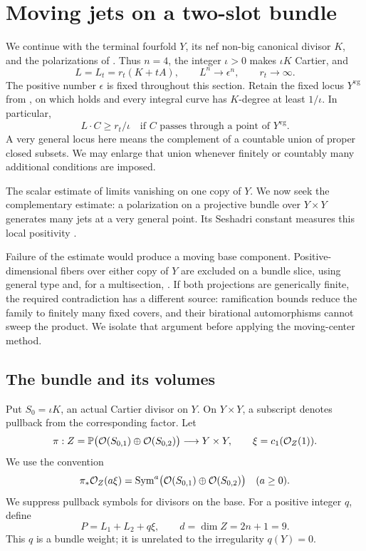 \section{Moving jets on a two-slot bundle}
\label{sec:two-slot-jets}

We continue with the terminal fourfold \(Y\), its nef non-big canonical
divisor \(K\), and the polarizations of
. Thus \(n=4\), the integer
\(\iota>0\) makes \(\iota K\) Cartier, and
\[
 L=L_t=r_t(K+tA),\qquad L^n\longrightarrow\epsilon^n,\qquad
 r_t\longrightarrow\infty .
\]
The positive number \(\epsilon\) is fixed throughout this section.
Retain the fixed locus \(Y^{\mathrm{vg}}\) from
, on which  holds
and every integral curve has \(K\)-degree at least \(1/\iota\).
In particular,
\begin{equation}\label{eq:two-slot-curve-lower-bound}
 L\cdot C\ge r_t/\iota
 \quad\text{if \(C\) passes through a point of \(Y^{\mathrm{vg}}\).}
\end{equation}
A very general locus here means the complement of a countable union
of proper closed subsets. We may enlarge that union whenever finitely
or countably many additional conditions are imposed.

The scalar estimate of  limits vanishing
on one copy of \(Y\). We now seek the complementary estimate: a
polarization on a projective bundle over \(Y\times Y\) generates
many jets at a very general point. Its Seshadri constant measures
this local positivity \cite[Chapter~5]{Lazarsfeld2004I}.

Failure of the estimate would produce a moving base component.
Positive-dimensional fibers over either copy of \(Y\) are excluded
on a bundle slice, using general type and, for a multisection,
. If both projections are generically
finite, the required contradiction has a different source:
ramification bounds reduce the family to finitely many fixed
covers, and their birational automorphisms cannot sweep the product.
We isolate that argument before applying the moving-center method.

\subsection{The bundle and its volumes}

Put \(S_0=\iota K\), an actual Cartier divisor on \(Y\). On
\(Y\times Y\), a subscript denotes pullback from the corresponding
factor. Let
\begin{equation}\label{eq:two-slot-bundle}
 \pi:Z=\mathbb P\bigl(\mathcal O(S_{0,1})\oplus\mathcal O(S_{0,2})\bigr)
       \longrightarrow Y\times Y,\qquad
 \xi=c_1(\mathcal O_Z(1)).
\end{equation}
We use the convention
\[
 \pi_*\mathcal O_Z(a\xi)
 =\operatorname{Sym}^a\bigl(\mathcal O(S_{0,1})\oplus\mathcal O(S_{0,2})\bigr)
 \quad(a\ge0).
\]
We suppress pullback symbols for divisors on the base. For a positive
integer \(q\), define
\begin{equation}\label{eq:two-slot-polarization}
 P=L_1+L_2+q\xi,\qquad d=\dim Z=2n+1=9.
\end{equation}
This \(q\) is a bundle weight; it is unrelated to the irregularity
\(q(Y)=0\).

